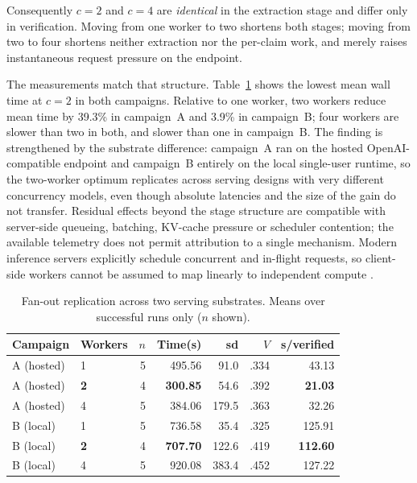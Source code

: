 \documentclass[conference]{IEEEtran}
\begin{document}
Consequently $c=2$ and $c=4$ are \emph{identical} in the extraction stage and differ only in verification. Moving from one worker to two shortens both stages; moving from two to four shortens neither extraction nor the per-claim work, and merely raises instantaneous request pressure on the endpoint.

The measurements match that structure. Table~\ref{tab:fanout} shows the lowest mean wall time at $c=2$ in both campaigns. Relative to one worker, two workers reduce mean time by 39.3\% in campaign~A and 3.9\% in campaign~B; four workers are slower than two in both, and slower than one in campaign~B. The finding is strengthened by the substrate difference: campaign~A ran on the hosted OpenAI-compatible endpoint and campaign~B entirely on the local single-user runtime, so the two-worker optimum replicates across serving designs with very different concurrency models, even though absolute latencies and the size of the gain do not transfer. Residual effects beyond the stage structure are compatible with server-side queueing, batching, KV-cache pressure or scheduler contention; the available telemetry does not permit attribution to a single mechanism. Modern inference servers explicitly schedule concurrent and in-flight requests, so client-side workers cannot be assumed to map linearly to independent compute \cite{yu2022orca,agrawal2024sarathi,nvidiaDynamoPlanner}.

\begin{table}[t]
\caption{Fan-out replication across two serving substrates. Means over successful runs only ($n$ shown).}
\label{tab:fanout}
\centering\scriptsize
\begin{tabular}{llrrrrr}
\toprule
Campaign & Workers & $n$ & Time(s) & sd & $V$ & s/verified\\
\midrule
A (hosted) & 1 & 5 & 495.56 & 91.0 & .334 & 43.13\\
A (hosted) & \textbf{2} & 4 & \textbf{300.85} & 54.6 & .392 & \textbf{21.03}\\
A (hosted) & 4 & 5 & 384.06 & 179.5 & .363 & 32.26\\
\midrule
B (local) & 1 & 5 & 736.58 & 35.4 & .325 & 125.91\\
B (local) & \textbf{2} & 4 & \textbf{707.70} & 122.6 & .419 & \textbf{112.60}\\
B (local) & 4 & 5 & 920.08 & 383.4 & .452 & 127.22\\
\bottomrule
\end{tabular}
\end{table}
\end{document}
